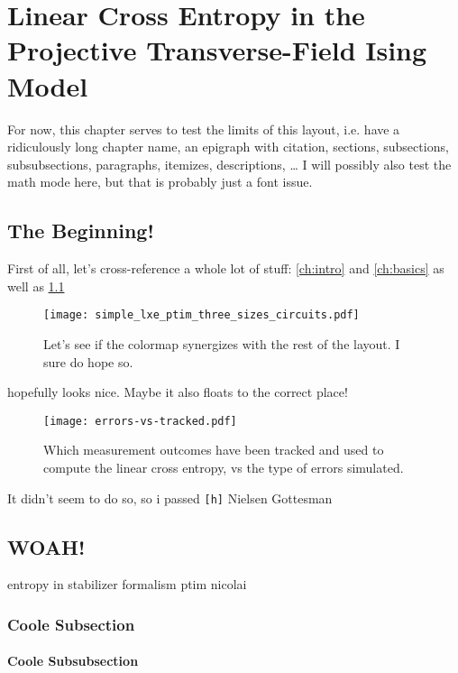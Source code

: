 \chapter{Linear Cross Entropy in the Projective Transverse-Field Ising Model}
\label{ch:lxe-ptim}
For now, this chapter serves to test the limits of this layout, i.e. have a
ridiculously long chapter name, an epigraph with citation, sections,
subsections, subsubsections, paragraphs, itemizes, descriptions, \ldots
I will possibly also test the math mode here, but that is probably just a font
issue.
\section{The Beginning!}
First of all, let's cross-reference a whole lot of stuff: \cref{ch:intro} and
\cref{ch:basics} as well as \cref{fig:firstattempt-lxe}

\begin{figure}
  \centering
  \texttt{[image: simple\_lxe\_ptim\_three\_sizes\_circuits.pdf]}
  \caption{Let's see if the colormap synergizes with the rest of the layout. I
  sure do hope so.}
  \label{fig:firstattempt-lxe}
\end{figure}

 hopefully looks nice. Maybe it also floats to the correct
place!
\begin{figure}[h]
  \centering
  \texttt{[image: errors-vs-tracked.pdf]}
  \caption{Which measurement outcomes have been tracked and used to compute the
  linear cross entropy, vs the type of errors simulated.}
  \label{fig:err-vs-tra}
\end{figure}
It didn't seem to do so, so i passed \texttt{[h]}
\lipsum[0-2]
Nielsen \cite{nielsenQuantumComputationQuantum2010} Gottesman
\cite{gottesmanStabilizerCodesQuantum1997}
\cite{aaronsonImprovedSimulationStabilizer2004}
\section{WOAH!}
\lipsum[3]
entropy in stabilizer formalism
\cite{fattalEntanglementStabilizerFormalism2004}
ptim nicolai \cite{langEntanglementTransitionProjective2020}
\subsection{Coole Subsection}
\lipsum[4-6]
\cite{roserDecodingProjectiveTransverse2023}
\subsubsection{Coole Subsubsection}
\lipsum[7-9]
